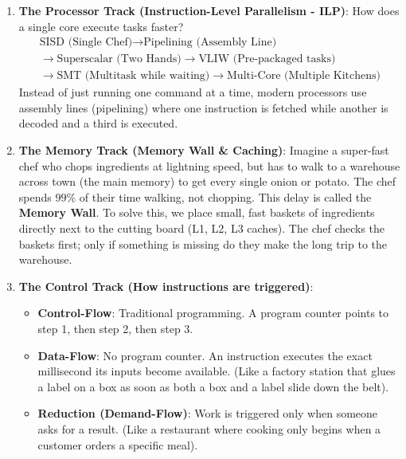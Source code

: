 \documentclass[11pt,a4paper]{article}
\begin{document}
\begin{enumerate}
    \item \textbf{The Processor Track (Instruction-Level Parallelism - ILP)}:
    How does a single core execute tasks faster?
    \begin{gather*}
        \text{SISD (Single Chef)} \longrightarrow \text{Pipelining (Assembly Line)} \\
        \longrightarrow \text{Superscalar (Two Hands)} \longrightarrow \text{VLIW (Pre-packaged tasks)} \\
        \longrightarrow \text{SMT (Multitask while waiting)} \longrightarrow \text{Multi-Core (Multiple Kitchens)}
    \end{gather*}
    Instead of just running one command at a time, modern processors use assembly lines (pipelining) where one instruction is fetched while another is decoded and a third is executed.

    \item \textbf{The Memory Track (Memory Wall \& Caching)}:
    Imagine a super-fast chef who chops ingredients at lightning speed, but has to walk to a warehouse across town (the main memory) to get every single onion or potato. The chef spends $99\%$ of their time walking, not chopping. This delay is called the \textbf{Memory Wall}.
    To solve this, we place small, fast baskets of ingredients directly next to the cutting board (L1, L2, L3 caches). The chef checks the baskets first; only if something is missing do they make the long trip to the warehouse.

    \item \textbf{The Control Track (How instructions are triggered)}:
    \begin{itemize}
        \item \textbf{Control-Flow}: Traditional programming. A program counter points to step 1, then step 2, then step 3.
        \item \textbf{Data-Flow}: No program counter. An instruction executes the exact millisecond its inputs become available. (Like a factory station that glues a label on a box as soon as both a box and a label slide down the belt).
        \item \textbf{Reduction (Demand-Flow)}: Work is triggered only when someone asks for a result. (Like a restaurant where cooking only begins when a customer orders a specific meal).
    \end{itemize}
\end{enumerate}
\end{document}
